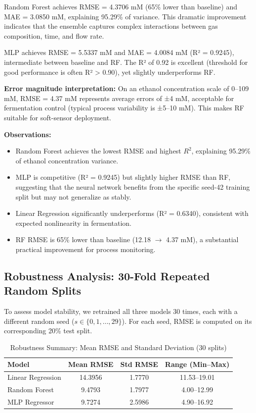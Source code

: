 \documentclass[conference]{IEEEtran}
\begin{document}
Random Forest achieves RMSE = 4.3706 mM (65\% lower than baseline) and MAE = 3.0850 mM, explaining 95.29\% of variance. This dramatic improvement indicates that the ensemble captures complex interactions between gas composition, time, and flow rate.

MLP achieves RMSE = 5.5337 mM and MAE = 4.0084 mM (R² = 0.9245), intermediate between baseline and RF. The R² of 0.92 is excellent (threshold for good performance is often R² > 0.90), yet slightly underperforms RF.

\textbf{Error magnitude interpretation:} On an ethanol concentration scale of 0–109 mM, RMSE = 4.37 mM represents average errors of ±4 mM, acceptable for fermentation control (typical process variability is ±5–10 mM). This makes RF suitable for soft-sensor deployment.

\textbf{Observations:}
\begin{itemize}
\item Random Forest achieves the lowest RMSE and highest $R^2$, explaining 95.29\% of ethanol concentration variance.
\item MLP is competitive (R² = 0.9245) but slightly higher RMSE than RF, suggesting that the neural network benefits from the specific seed-42 training split but may not generalize as stably.
\item Linear Regression significantly underperforms (R² = 0.6340), consistent with expected nonlinearity in fermentation.
\item RF RMSE is 65\% lower than baseline (12.18 $\to$ 4.37 mM), a substantial practical improvement for process monitoring.
\end{itemize}

\subsection{Robustness Analysis: 30-Fold Repeated Random Splits}

To assess model stability, we retrained all three models 30 times, each with a different random seed ($s \in \{0, 1, \ldots, 29\}$). For each seed, RMSE is computed on its corresponding 20\% test split.

\begin{table}[htbp]
\caption{Robustness Summary: Mean RMSE and Standard Deviation (30 splits)}
\centering
\begin{tabular}{lccc}
\toprule
Model & Mean RMSE & Std RMSE & Range (Min–Max) \\
\midrule
Linear Regression & 14.3956 & 1.7770 & 11.53–19.01 \\
Random Forest & 9.4793 & 1.7977 & 4.00–12.99 \\
MLP Regressor & 9.7274 & 2.5986 & 4.90–16.92 \\
\bottomrule
\end{tabular}
\end{table}
\end{document}
